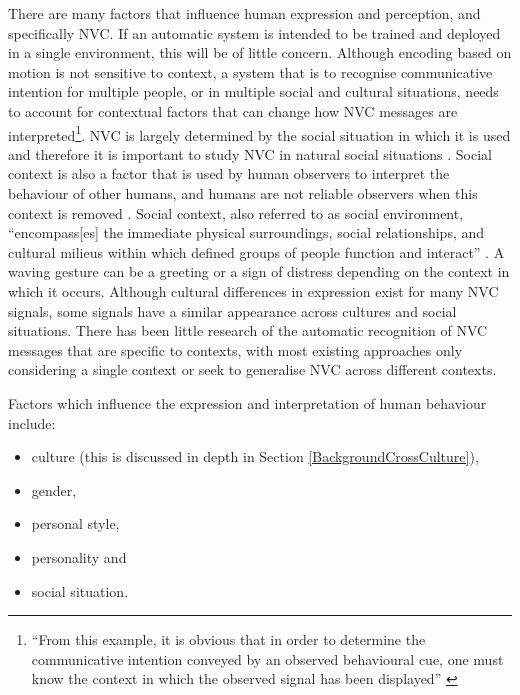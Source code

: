 There are many factors that influence human expression and perception, and specifically \ac{NVC}. If an automatic system is intended to be trained and deployed in a single environment, this will be of little concern. Although encoding based on motion is not sensitive to context, a system that is to recognise communicative intention for multiple people, or in multiple social and cultural situations, needs to account for contextual factors that can change how \ac{NVC} messages are interpreted\footnote{``From this example, it is obvious that in order to determine the communicative intention conveyed by an observed behavioural cue, one must know the context in which the observed signal has been displayed'' \cite{Pantic2008}}. \ac{NVC} is largely determined by the social situation in which it is used and therefore it is important to study \ac{NVC} in natural social situations \cite{Bavelas97}. Social context is also a factor that is used by human observers to interpret the behaviour of other humans, and humans are not reliable observers when this context is removed \cite{Hoque2009}. Social context, also referred to as social environment, ``encompass[es] the immediate physical surroundings, social relationships, and cultural milieus within which defined groups of people function and interact'' \cite{Barnett2001}. A waving gesture can be a greeting or a sign of distress depending on the context in which it occurs. Although cultural differences in expression exist for many \ac{NVC} signals, some signals have a similar appearance across cultures and social situations. There has been little research of the automatic recognition of \ac{NVC} messages that are specific to contexts, with most existing approaches only considering a single context or seek to generalise \ac{NVC} across different contexts.


Factors which influence the expression and interpretation of human behaviour include:

\begin{itemize}
 \item culture (this is discussed in depth in Section \ref{BackgroundCrossCulture}),
 \item gender,
 \item personal style,
 \item personality and
 \item social situation.
\end{itemize}

